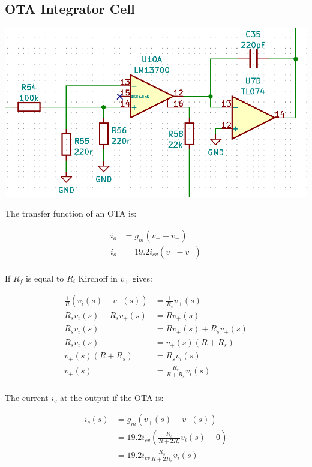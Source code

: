 \documentclass{article}
\begin{document}
\subsection{OTA Integrator Cell}

\includegraphics[width=\linewidth]{images/otacell.png}

The transfer function of an OTA is:

\begin{equation*}
\begin{split}
  i_o & = g_m(v_+ - v_-) \\
  i_o & = 19.2i_{cv}(v_+ - v_-) \\
\end{split}
\end{equation*}

If $R_f$ is equal to $R_i$
Kirchoff in $v_+$ gives:

\begin{equation*}
\begin{split}
  \frac{1}{R}(v_i(s) - v_+(s)) & = \frac{1}{R_s}v_+(s) \\
  R_sv_i(s) - R_sv_+(s) & = Rv_+(s) \\
  R_sv_i(s) & = Rv_+(s) + R_sv_+(s) \\
  R_sv_i(s) & = v_+(s)(R + R_s) \\
  v_+(s)(R + R_s) & = R_sv_i(s) \\
  v_+(s) & = \frac{R_s}{R + R_s}v_i(s) \\
\end{split}
\end{equation*}

The current $i_c$ at the output if the OTA is:

\begin{equation*}
\begin{split}
  i_c(s) & = g_m(v_+(s) - v_-(s)) \\
   & = 19.2i_{cv}(\frac{R_s}{R + 2R_s}v_i(s) - 0) \\
   & = 19.2i_{cv}\frac{R_s}{R + 2R_s}v_i(s) \\
\end{split}
\end{equation*}
\end{document}
